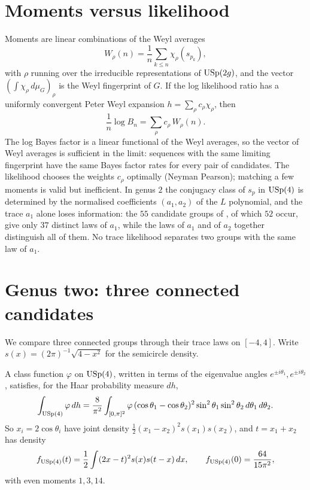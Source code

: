 \section{Moments versus likelihood}

Moments are linear combinations of the Weyl averages
\[
W_\rho(n)=\frac1n\sum_{k\le n}\chi_\rho(s_{p_k}),
\]
with $\rho$ running over the irreducible representations of $\mathrm{USp}(2g)$, and the vector $(\int\chi_\rho\,d\mu_G)_\rho$ is the Weyl fingerprint of $G$. If the log likelihood ratio has a uniformly convergent Peter Weyl expansion $h=\sum_\rho c_\rho\chi_\rho$, then
\[
\frac1n\log B_n=\sum_\rho c_\rho\,W_\rho(n).
\]
The log Bayes factor is a linear functional of the Weyl averages, so the vector of Weyl averages is sufficient in the limit: sequences with the same limiting fingerprint have the same Bayes factor rates for every pair of candidates. The likelihood chooses the weights $c_\rho$ optimally (Neyman Pearson); matching a few moments is valid but inefficient. In genus $2$ the conjugacy class of $s_p$ in $\mathrm{USp}(4)$ is determined by the normalised coefficients $(a_1,a_2)$ of the $L$ polynomial, and the trace $a_1$ alone loses information: the $55$ candidate groups of \cite{fkrs2012}, of which $52$ occur, give only $37$ distinct laws of $a_1$, while the laws of $a_1$ and of $a_2$ together distinguish all of them. No trace likelihood separates two groups with the same law of $a_1$.

\section{Genus two: three connected candidates}

We compare three connected groups through their trace laws on $[-4,4]$. Write $s(x)=(2\pi)^{-1}\sqrt{4-x^2}$ for the semicircle density.

\begin{proposition}\label{thm:12usp4}
A class function $\varphi$ on $\mathrm{USp}(4)$, written in terms of the eigenvalue angles $e^{\pm i\theta_1},e^{\pm i\theta_2}$, satisfies, for the Haar probability measure $dh$,
\[
\int_{\mathrm{USp}(4)}\varphi\,dh=\frac8{\pi^2}\int_{[0,\pi]^2}\varphi\,(\cos\theta_1-\cos\theta_2)^2\sin^2\theta_1\sin^2\theta_2\,d\theta_1\,d\theta_2 .
\]
So $x_i=2\cos\theta_i$ have joint density $\frac12(x_1-x_2)^2s(x_1)s(x_2)$, and $t=x_1+x_2$ has density
\[
f_{\mathrm{USp}(4)}(t)=\frac12\int(2x-t)^2s(x)s(t-x)\,dx,\qquad f_{\mathrm{USp}(4)}(0)=\frac{64}{15\pi^2},
\]
with even moments $1,3,14$.
\end{proposition}

